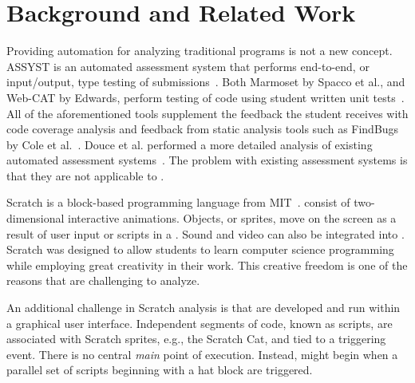 \section{Background and Related Work}

Providing automation for analyzing traditional programs is not a new concept.
ASSYST is an automated assessment system that performs end-to-end, or
input/output, type testing of
submissions~\cite{Jackson:1997:GSP:268084.268210}. Both Marmoset by Spacco et
al., and Web-CAT by Edwards, perform testing of code using student written unit
tests~\cite{Spacco:2006:EMD:1140124.1140131,
  Edwards:2003:RCS:949344.949390}. All of the aforementioned tools supplement
the feedback the student receives with code coverage analysis and feedback from
static analysis tools such as FindBugs by Cole et
al.~\cite{Cole:2006:IYS:1176617.1176667}. Douce et al. performed a more
detailed analysis of existing automated assessment
systems~\cite{Douce:2005:ATA:1163405.1163409}.  The problem with existing
assessment systems is that they are not applicable to .

Scratch is a block-based programming language from
MIT~\cite{Maloney:2010:SPL:1868358.1868363}.   consist of
two-dimensional interactive animations.  Objects, or sprites, move on the
screen as a result of user input or scripts in a \sprogram{}.  Sound and video
can also be integrated into .  Scratch was designed to allow
students to learn computer science programming while employing great creativity
in their work.  This creative freedom is one of the reasons that 
are challenging to analyze.

An additional challenge in Scratch analysis is that  are developed
and run within a graphical user interface.  Independent segments of code, known
as scripts, are associated with Scratch sprites, e.g., the Scratch Cat, and
tied to a triggering event.  There is no central \emph{main} point of
execution.  Instead,  might begin when a parallel set of scripts
beginning with a \greenflag{} hat block are triggered.

